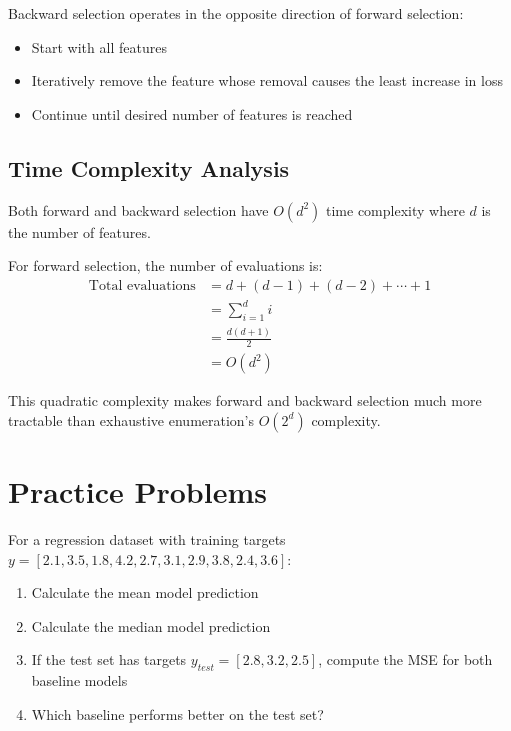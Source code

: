 \documentclass{article}
\newcounter{exercise}
\begin{document}
Backward selection operates in the opposite direction of forward selection:
\begin{itemize}
    \item Start with all features
    \item Iteratively remove the feature whose removal causes the least increase in loss
    \item Continue until desired number of features is reached
\end{itemize}

\subsection{Time Complexity Analysis}

Both forward and backward selection have $O(d^2)$ time complexity where $d$ is the number of features.

For forward selection, the number of evaluations is:
\begin{align}
\text{Total evaluations} &= d + (d-1) + (d-2) + \cdots + 1 \\
&= \sum_{i=1}^{d} i \\
&= \frac{d(d+1)}{2} \\
&= O(d^2)
\end{align}

This quadratic complexity makes forward and backward selection much more tractable than exhaustive enumeration's $O(2^d)$ complexity.

\section{Practice Problems}

\begin{tcolorbox}[colback=blue!5!white,colframe=blue!75!black,title=\textbf{Exercise \theexercise: Baseline Model Selection}]
For a regression dataset with training targets $y = [2.1, 3.5, 1.8, 4.2, 2.7, 3.1, 2.9, 3.8, 2.4, 3.6]$:

\begin{enumerate}[label=(\alph*)]
    \item Calculate the mean model prediction
    \item Calculate the median model prediction  
    \item If the test set has targets $y_{test} = [2.8, 3.2, 2.5]$, compute the MSE for both baseline models
    \item Which baseline performs better on the test set?
\end{enumerate}
\end{tcolorbox}
\end{document}
